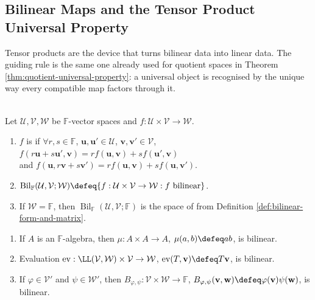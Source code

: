 \subsection{Bilinear Maps and the Tensor Product Universal Property}


Tensor products are the device that turns bilinear data into linear data. The guiding rule is the same one already used for quotient spaces in Theorem \ref{thm:quotient-universal-property}: a universal object is recognised by the unique way every compatible map factors through it.

\begin{definition} \label{def:bilinear-map} \\
Let $\mathcal{U},\mathcal{V},\mathcal{W}$ be $\mathbb{F}$-vector spaces and $f:\mathcal{U}\times\mathcal{V}\to\mathcal{W}$.
\begin{enumerate}[label=(\roman*)]
\setlength{\itemsep}{0pt}
\item $f$ is  if $\forall r,s\in\mathbb{F}$, $\mathbf{u},\mathbf{u}'\in\mathcal{U}$, $\mathbf{v},\mathbf{v}'\in\mathcal{V}$, $f(r\mathbf{u}+s\mathbf{u}',\mathbf{v})=r f(\mathbf{u},\mathbf{v})+s f(\mathbf{u}',\mathbf{v})$\\
and $f(\mathbf{u},r\mathbf{v}+s\mathbf{v}')=r f(\mathbf{u},\mathbf{v})+s f(\mathbf{u},\mathbf{v}')$.
\item $\operatorname{Bil}_{\mathbb{F}}(\mathcal{U},\mathcal{V};\mathcal{W})\defeq\{f:\mathcal{U}\times\mathcal{V}\to\mathcal{W}:f\text{ bilinear}\}$.
\item If $\mathcal{W}=\mathbb{F}$, then $\operatorname{Bil}_{\mathbb{F}}(\mathcal{U},\mathcal{V};\mathbb{F})$ is the space of  from Definition \ref{def:bilinear-form-and-matrix}.
\end{enumerate}
\end{definition}

\begin{example} \label{ex:basic-bilinear-maps} 
\begin{enumerate}[label=(\roman*)]
\setlength{\itemsep}{0pt}
\item If $A$ is an $\mathbb{F}$-algebra, then $\mu:A\times A\to A$, $\mu(a,b)\defeq ab$, is bilinear.
\item Evaluation $\operatorname{ev}:\LL(\mathcal{V},\mathcal{W})\times\mathcal{V}\to\mathcal{W}$, $\operatorname{ev}(T,\mathbf{v})\defeq T\mathbf{v}$, is bilinear.
\item If $\varphi\in\mathcal{V}'$ and $\psi\in\mathcal{W}'$, then $B_{\varphi,\psi}:\mathcal{V}\times\mathcal{W}\to\mathbb{F}$, $B_{\varphi,\psi}(\mathbf{v},\mathbf{w})\defeq\varphi(\mathbf{v})\psi(\mathbf{w})$, is bilinear.
\end{enumerate}
\end{example}

